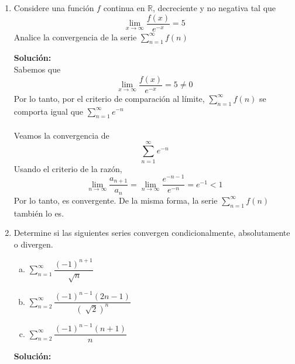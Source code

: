 \documentclass[12pt]{article}
\newenvironment{solucion}
{\begin{mdframed}[backgroundcolor=black!10]
		{\bf Solución:}\\
	}
	{
	\end{mdframed}
}
\newenvironment{preguntas}
{\begin{enumerate}\itemsep12pt
	}
	{
	\end{enumerate}
}
\newcommand{\ra}{\rightarrow}
\newcommand{\R}{\mathbb{R}}
\begin{document}
\begin{preguntas}
\begin{solucion}
\begin{enumerate}[a)]
			Luego, $\displaystyle\int_2^{\infty} \dfrac{1}{xln(x)}$ diverge, por lo que por criterio de la integral, $\sum\limits_{n=2}^{\infty} \dfrac{1}{nln(n)}$ tambiém diverge. Finalmente, por el criterio de comparación al limite, la serie $\sum\limits_{n=2}^{\infty}\dfrac{n}{(n+1)^2ln(n)}$ es divergente.
\item $\sum\limits_{n=1}^{\infty}\dfrac{n!}{n^n}$\\
			\\
			Recordemos que en el infinito,
			$$n^n > n! > a^n > n > ln(n)$$
			El límite de la sucesión es
			$$\lim\limits_{n\ra\infty}\dfrac{n!}{n^n} = 0$$
			Usando el criterio de la razón,
			$$\lim\limits_{n \ra \infty} \dfrac{a_{n+1}}{a_n}
			= \lim\limits_{n \ra \infty} \dfrac{\dfrac{(n+1)!}{(n+1)^{n+1}}}{\dfrac{n!}{n^n}}
			= \lim\limits_{n \ra \infty} \dfrac{(n+1)!}{n!}\dfrac{n^n}{(n+1)^{n+1}}$$
			$$= \lim\limits_{n \ra \infty} \dfrac{(n+1)}{1}\dfrac{n^n}{(n+1)^{n+1}}
			= \lim\limits_{n \ra \infty} \dfrac{n^n}{(n+1)^{n}}
			= \lim\limits_{n \ra \infty} \left(\dfrac{n}{n+1}\right)^n$$
			$$= \lim\limits_{n \ra \infty} \dfrac{1}{\left(\dfrac{n+1}{n}\right)^n}
			= \dfrac{1}{e} < 1$$
			Por criterio de la razón, la serie es convergente.
\end{enumerate}
\end{solucion}
\item Considere una función $f$ continua en $\R$, decreciente y no negativa tal que
	$$\lim_{x\ra\infty}\dfrac{f(x)}{e^{-x}}=5$$
	Analice la convergencia de la serie $\sum\limits_{n=1}^{\infty}f(n)$
\begin{solucion}
Sabemos que
		$$\lim_{x\ra\infty}\dfrac{f(x)}{e^{-x}}=5 \neq 0$$
		Por lo tanto, por el criterio de comparación al límite, $\sum\limits_{n=1}^{\infty}f(n)$ se comporta igual que $\sum\limits_{n=1}^{\infty}e^{-n}$\\
		\\
		Veamos la convergencia de 
		$$\sum\limits_{n=1}^{\infty}e^{-n}$$
		Usando el criterio de la razón,
		$$\lim\limits_{n \ra \infty} \dfrac{a_{n+1}}{a_n}
		= \lim\limits_{n \ra \infty} \dfrac{e^{-n-1}}{e^{-n}}
		= e^{-1} < 1$$
		Por lo tanto, es convergente. De la misma forma, la serie $\sum\limits_{n=1}^{\infty}f(n)$ también lo es.
\end{solucion}
\item Determine si las siguientes series convergen condicionalmente, absolutamente o divergen.
\begin{enumerate}[a)]
\item $\sum\limits_{n=1}^{\infty}\dfrac{(-1)^{n+1}}{\sqrt[]{n}}$
\item $\sum\limits_{n=2}^{\infty}\dfrac{(-1)^{n-1}(2n-1)}{(\sqrt[]{2})^n}$
\item $\sum\limits_{n=2}^{\infty}\dfrac{(-1)^{n-1}(n+1)}{n}$
\end{enumerate}
\begin{solucion}


\end{solucion}
\end{preguntas}
\end{document}

